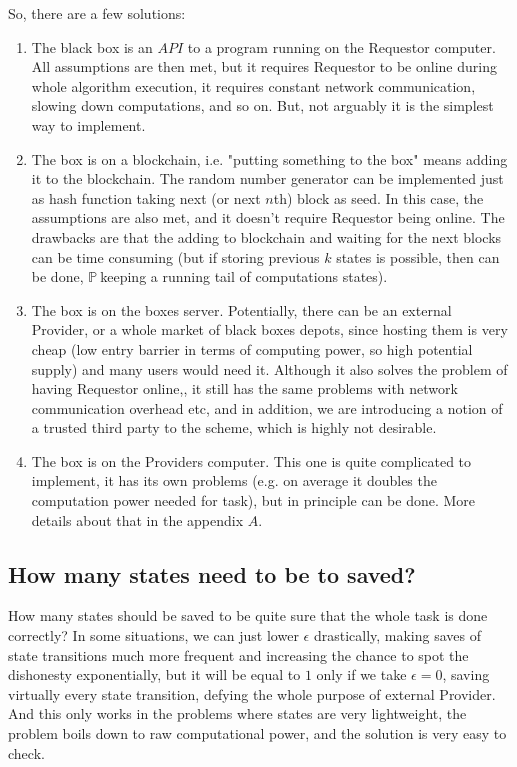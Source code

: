 \documentclass{winnower}
\newcommand{\X}{$\mathbb{P\ }$}
\begin{document}
So, there are a few solutions:
\begin{enumerate}
\item The black box is an $API$ to a program running on the Requestor computer. All assumptions are then met, but it requires Requestor to be online during whole algorithm execution, it requires constant network communication, slowing down computations, and so on. But, not arguably it is the simplest way to implement.
\item The box is on a blockchain, i.e. "putting something to the box" means adding it to the blockchain. The random number generator can be implemented just as hash function taking next (or next $n$th) block as seed. In this case, the assumptions are also met, and it doesn't require Requestor being online. The drawbacks are that the adding to blockchain and waiting for the next blocks can be time consuming (but if  storing previous $k$ states is possible, then can be done, \X keeping a running tail of computations states).
\item The box is on the boxes server. Potentially, there can be an external Provider, or a whole market of black boxes depots, since hosting them is very cheap (low entry barrier in terms of computing power, so high potential supply) and many users would need it. Although it also solves the problem of having Requestor online,, it still has the same problems with network communication overhead etc, and in addition, we are introducing a notion of a trusted third party to the scheme, which is highly not desirable.
\item The box is on the Providers computer. This one is quite complicated to implement, it has its own problems (e.g. on average it doubles the computation power needed for task), but in principle can be done. More details about that in the appendix $A$.
\end{enumerate}

\subsection{How many states need to be to saved?}
How many states should be saved to be quite sure that the whole task is done correctly? In some situations, we can just lower $\epsilon$ drastically, making saves of state transitions much more frequent and increasing the chance to spot the dishonesty exponentially, but it will be equal to $1$ only if we take $\epsilon=0$, saving virtually every state transition, defying the whole purpose of external Provider. And this only works in the problems where states are very lightweight, the problem boils down to raw computational power, and the solution is very easy to check. 
\end{document}
